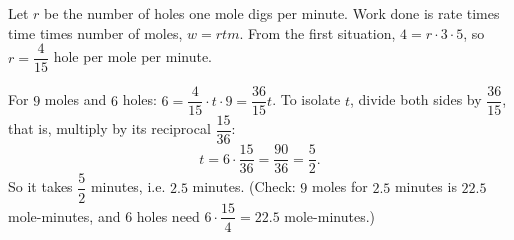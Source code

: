 Let $r$ be the number of holes one mole digs per minute. Work done is rate times time times number of moles, $w=rtm$. From the first situation, $4=r\cdot3\cdot5$, so $r=\dfrac{4}{15}$ hole per mole per minute.

For $9$ moles and $6$ holes: $6=\dfrac{4}{15}\cdot t\cdot9=\dfrac{36}{15}t$. To isolate $t$, divide both sides by $\dfrac{36}{15}$, that is, multiply by its reciprocal $\dfrac{15}{36}$:
\[
t=6\cdot\dfrac{15}{36}=\dfrac{90}{36}=\dfrac{5}{2} .
\]
So it takes $\boxed{\dfrac{5}{2}}$ minutes, i.e. $2.5$ minutes. (Check: $9$ moles for $2.5$ minutes is $22.5$ mole-minutes, and $6$ holes need $6\cdot\dfrac{15}{4}=22.5$ mole-minutes.)
